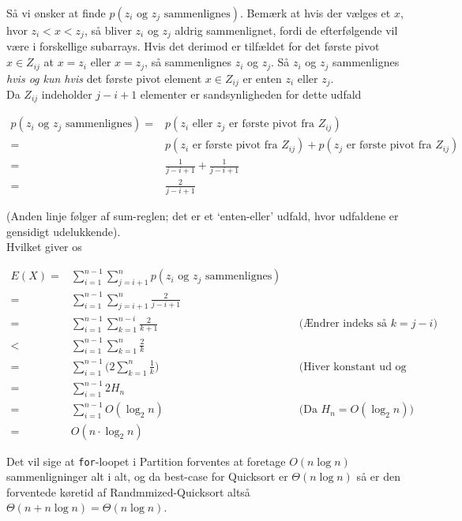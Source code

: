 \documentclass[12pt]{article}
\begin{document}
Så vi ønsker at finde $p(z_i \text{ og } z_j \text{ sammenlignes})$. Bemærk at hvis der vælges et $x$, hvor $z_i < x < z_j$, så bliver $z_i$ og $z_j$ aldrig sammenlignet, fordi de efterfølgende vil være i forskellige subarrays. Hvis det derimod er tilfældet for det første pivot $x \in Z_{ij}$ at $x = z_i$ eller $x=z_j$, så sammenlignes $z_i$ og $z_j$. Så $z_i$ og $z_j$ sammenlignes \textit{hvis og kun hvis} det første pivot element $x \in Z_{ij}$ er enten $z_i$ eller $z_j$. \\

Da $Z_{ij}$ indeholder $j-i+1$ elementer er sandsynligheden for dette udfald  

\begin{align*}
    p(z_i \text{ og } z_j \text{ sammenlignes}) =& p(z_i \text{ eller } z_j \text{ er første pivot fra } Z_{ij}) \\
    =& p(z_i \text{ er første pivot fra } Z_{ij}) + p(z_j \text{ er første pivot fra } Z_{ij}) \\
    =& \frac{1}{j-i+1}+\frac{1}{j-i+1} \\
    =& \frac{2}{j-i+1}
\end{align*}

(Anden linje følger af sum-reglen; det er et `enten-eller' udfald, hvor udfaldene er gensidigt udelukkende). \\

Hvilket giver os

\begin{align*}
    E(X) =&  \sum_{i=1}^{n-1} \sum_{j=i+1}^n p(z_i \text{ og } z_j \text{ sammenlignes})  \\
    =& \sum_{i=1}^{n-1} \sum_{j=i+1}^n \frac{2}{j-i+1} \\
    =& \sum_{i=1}^{n-1} \sum_{k=1}^{n-i} \frac{2}{k+1} && \text{(Ændrer indeks så } k = j-i) \\
    <&  \sum_{i=1}^{n-1} \sum_{k=1}^n \frac{2}{k} \\
    =&  \sum_{i=1}^{n-1} \bigg( 2  \sum_{k=1}^n \frac{1}{k} \bigg) && \text{(Hiver konstant ud og inkluderer flere led)} \\
    =& \sum_{i=1}^{n-1} 2H_n \\
    =& \sum_{i=1}^{n-1} O(\log_2 n) && \text{(Da } H_n = O(\log_2 n))\\
    =& O(n \cdot \log_2 n)
\end{align*}

Det vil sige at \texttt{for}-loopet i Partition forventes at foretage $O(n \log n)$ sammenligninger alt i alt, og da best-case for Quicksort er $\Theta(n \log n)$ så er den forventede køretid af Randmmized-Quicksort altså $\Theta(n+n \log n)=\Theta(n \log n)$.
\end{document}

